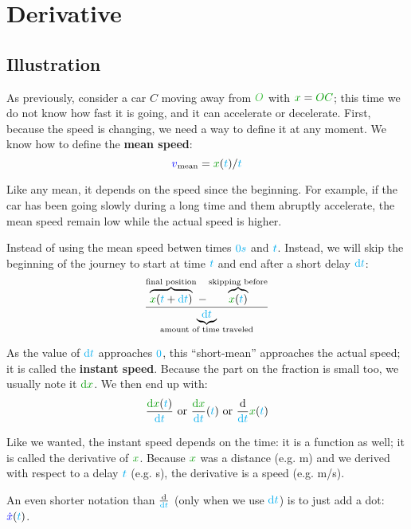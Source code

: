 \section{Derivative}


\subsection{Illustration}

As previously, consider a car $C$ moving away from $\posit{O}$ with
$\dist{x} = \dist{OC}$; this time we do not know how fast it is going, and
it can accelerate or decelerate. First, because the speed is changing,
we need a way to define it at any moment. We know how to define the
\textbf{mean speed}:
\[
\speed{v}_{\mathrm{mean}} = \dist{x}(\delay{t}) / \delay{t}
\]

Like any mean, it depends on the speed since the beginning. For example,
if the car has been going slowly during a long time and them abruptly
accelerate, the mean speed remain low while the actual speed is higher.

Instead of using the mean speed betwen times $\textcolor{cyan}{0s}$ and
$\textcolor{cyan}{t}$. Instead, we will skip the beginning of the journey to start
at time $\textcolor{cyan}{t}$ and end after a short delay $\textcolor{cyan}{\mathrm{d} t}$:
\[
\frac {
	\overbrace{\dist{x}(\delay{t}+\delay{\dt})}^{\text{final position}}
	- \overbrace{\dist{x}(\delay{t})}^{\text{skipping before}}
} {\underbrace{\delay{\dt}}_{\text{amount of time traveled}}}
\]

As the value of $\textcolor{cyan}{\mathrm{d} t}$ approaches $\textcolor{cyan}{0}$, this
“short-mean” approaches the actual speed; it is called the
\textbf{instant speed}. Because the part on the fraction is small too,
we usually note it $\dist{\d x}$. We then end up with:
\[
\frac {\dist{\d x}(\delay{t})} {\delay{\dt}}
\text{ or }
\frac {\dist{\d x}} {\delay{\dt}}(\delay{t})
\text{ or }
\frac {\d} {\delay{\dt}} \dist{x}(\delay{t})
\]

Like we wanted, the instant speed depends on the time: it is a function
as well; it is called the derivative of $\dist{x}$. Because $\dist{x}$
was a distance (e.g. m) and we derived with respect to a delay $\textcolor{cyan}{t}$
(e.g. s), the derivative is a speed (e.g. m/s).

\begin{remark}
An even shorter notation than $\frac {\mathrm{d}} {\textcolor{cyan}{\mathrm{d} t}}$ (only when we
use $\textcolor{cyan}{\mathrm{d} t}$) is to just add a dot: $\textcolor{blue}{\dot x}(\textcolor{cyan}{t})$.
\end{remark}


